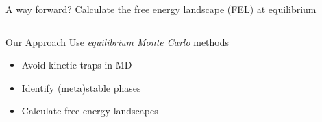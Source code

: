 \documentclass[aspectratio=169]{beamer}
\begin{document}
\begin{frame}[c]{A way forward? Calculate the free energy landscape (FEL) at equilibrium}
\begin{columns}[T, onlytextwidth]
  \end{columns}

  \vspace{15pt}

  \begin{columns}[T, onlytextwidth]
  

    \centering

    \vspace{-0.5\baselineskip}
    \begin{block}{Our Approach}
      Use \emph{equilibrium Monte Carlo} methods
      \begin{itemize}
        \item Avoid kinetic traps in MD
        \item Identify (meta)stable phases
        \only<1>{\item Study crystalline and nematic order}
        \item Calculate free energy landscapes
      \end{itemize}
    \end{block}


    \centering
    \vspace{3.5\baselineskip}
    \vspace{5pt}

\end{columns}
\end{frame}
\end{document}
